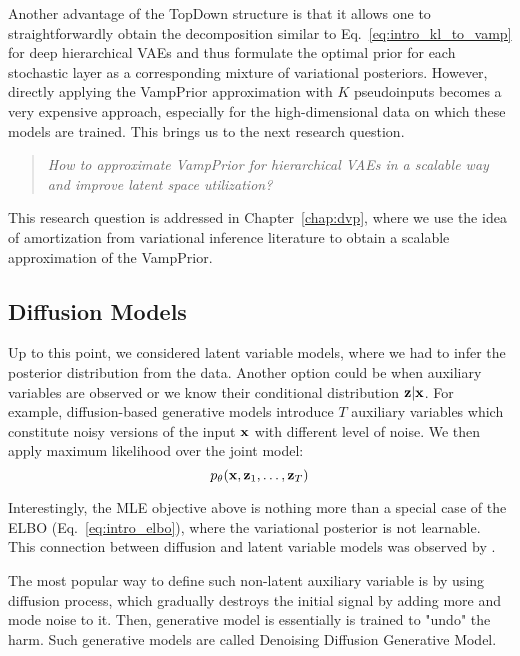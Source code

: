 Another advantage of the TopDown structure is that it allows one to straightforwardly obtain the decomposition similar to Eq.~\ref{eq:intro_kl_to_vamp} for deep hierarchical VAEs and thus formulate the optimal prior for each stochastic layer as a corresponding mixture of variational posteriors. 
However, directly applying the VampPrior approximation with $K$ pseudoinputs becomes a very expensive approach, especially for the high-dimensional data on which these models are trained. This brings us to the next research question.
\begin{quote}
	\textit{How to approximate VampPrior for hierarchical VAEs in a scalable way and improve latent space utilization?}
\end{quote}
This research question is addressed in Chapter~\ref{chap:dvp}, where we use the idea of amortization from variational inference literature to obtain a scalable approximation of the VampPrior. 

\subsection{Diffusion Models}
Up to this point, we considered latent variable models, where we had to infer the posterior distribution from the data. Another option could be when auxiliary variables are observed or we know their conditional distribution ${\mathbf{z}}|{\mathbf{x}}$. For example, diffusion-based generative models introduce $T$ auxiliary variables which constitute noisy versions of the input ${\mathbf{x}}$ with different level of noise. We then apply maximum likelihood over the joint model:
\begin{equation}
p_{\theta}({\mathbf{x}}, {\mathbf{z}}_1, \dots, {\mathbf{z}}_T)
\end{equation}

Interestingly, the MLE objective above is nothing more than a special case of the ELBO (Eq.~\ref{eq:intro_elbo}), where the variational posterior is not learnable. This connection between diffusion and latent variable models was observed by \citet{huang2021variational, kingma2021variational, tzen2019neural}.

The most popular way to define such non-latent auxiliary variable is by using diffusion process, which gradually destroys the initial signal by adding more and mode noise to it. Then, generative model is essentially is trained to "undo" the harm. Such generative models are called Denoising Diffusion Generative Model.


